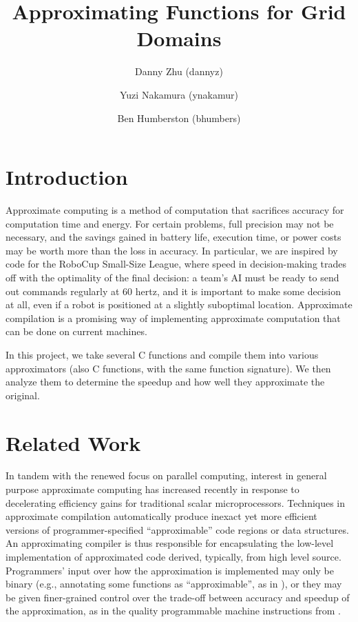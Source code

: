 \documentclass{article}
\begin{document}
\title{Approximating Functions for Grid Domains}
\author{Danny Zhu (dannyz) \and Yuzi Nakamura (ynakamur) \and Ben Humberston (bhumbers)}

\maketitle

\section{Introduction}

Approximate computing is a method of computation that sacrifices accuracy for computation time and energy. For certain problems, full precision may not be necessary, and the savings gained in battery life, execution time, or power costs may be worth more than the loss in accuracy. In particular, we are inspired by code for the RoboCup Small-Size League, where speed in decision-making trades off with the optimality of the final decision: a team's AI must be ready to send out commands regularly at 60 hertz, and it is important to make some decision at all, even if a robot is positioned at a slightly suboptimal location. Approximate compilation is a promising way of implementing approximate computation that can be done on current machines.

In this project, we take several C functions and compile them into various approximators (also C functions, with the same function signature). We then analyze them to determine the speedup and how well they approximate the original.

\section{Related Work}
In tandem with the renewed focus on parallel computing, interest in general purpose approximate computing has increased recently in response to decelerating efficiency gains for traditional scalar microprocessors. Techniques in approximate compilation automatically produce inexact yet more efficient versions of programmer-specified ``approximable'' code regions or data structures. An approximating compiler is thus responsible for encapsulating the low-level implementation of approximated code derived, typically, from high level source. Programmers' input over how the approximation is implemented may only be binary (e.g., annotating some functions as ``approximable'', as in \cite{Esmaeilzadeh12}), or they may be given finer-grained control over the trade-off between accuracy and speedup of the approximation, as in the quality programmable machine instructions from \cite{Venkataramani13}.
\end{document}
